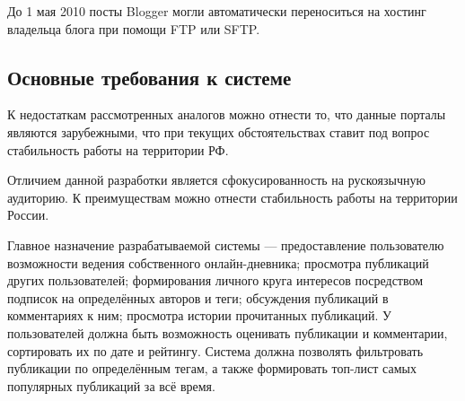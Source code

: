 До 1 мая 2010 посты Blogger могли автоматически переноситься на хостинг владельца блога при помощи FTP или SFTP.

\subsection{Основные требования к системе}

К недостаткам рассмотренных аналогов можно отнести то, что данные порталы являются зарубежными, что при текущих обстоятельствах ставит под вопрос стабильность работы на территории РФ.

Отличием данной разработки является сфокусированность на рускоязычную аудиторию.
К преимуществам можно отнести стабильность работы на территории России.

Главное назначение разрабатываемой системы — предоставление пользователю возможности ведения собственного онлайн-дневника; просмотра публикаций других пользователей; формирования личного круга интересов посредством подписок на определённых авторов и теги; обсуждения публикаций в комментариях к ним; просмотра истории прочитанных публикаций.
У пользователей должна быть возможность оценивать публикации и комментарии, сортировать их по дате и рейтингу.
Система должна позволять фильтровать публикации по определённым тегам, а также формировать топ-лист самых популярных публикаций за всё время.

